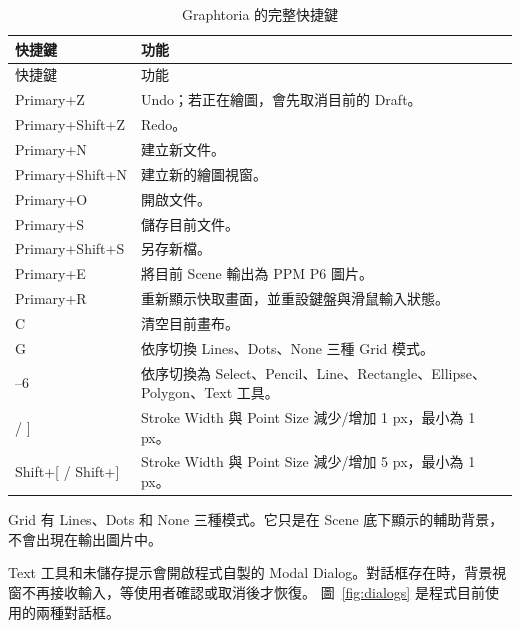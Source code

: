 {\small
\begin{longtable}{>{\raggedright\arraybackslash}p{} p{}}
    \caption{Graphtoria 的完整快捷鍵}\label{tab:shortcuts}              \\
    \toprule
    快捷鍵             & 功能                                          \\
    \midrule
    \endfirsthead
    \toprule
    快捷鍵             & 功能                                          \\
    \midrule
    \endhead
    Primary+Z       & Undo；若正在繪圖，會先取消目前的 Draft。                   \\
    Primary+Shift+Z & Redo。                                       \\
    Primary+N       & 建立新文件。                                      \\
    Primary+Shift+N & 建立新的繪圖視窗。                                   \\
    Primary+O       & 開啟文件。                                       \\
    Primary+S       & 儲存目前文件。                                     \\
    Primary+Shift+S & 另存新檔。                                       \\
    Primary+E       & 將目前 Scene 輸出為 PPM P6 圖片。                    \\
    Primary+R       & 重新顯示快取畫面，並重設鍵盤與滑鼠輸入狀態。                      \\
    C               & 清空目前畫布。                                     \\
    G               & 依序切換 Lines、Dots、None 三種 Grid 模式。            \\
    0--6            & 依序切換為 Select、Pencil、Line、Rectangle、Ellipse、Polygon、Text 工具。 \\
    {[} / {]}             & Stroke Width 與 Point Size 減少/增加 1 px，最小為 1 px。 \\
    Shift+{[} / Shift+{]} & Stroke Width 與 Point Size 減少/增加 5 px，最小為 1 px。 \\
    \bottomrule
\end{longtable}
}

Grid 有 Lines、Dots 和 None 三種模式。它只是在 Scene 底下顯示的輔助背景，不會出現在輸出圖片中。

Text 工具和未儲存提示會開啟程式自製的 Modal Dialog。對話框存在時，背景視窗不再接收輸入，等使用者確認或取消後才恢復。
圖~\ref{fig:dialogs} 是程式目前使用的兩種對話框。


